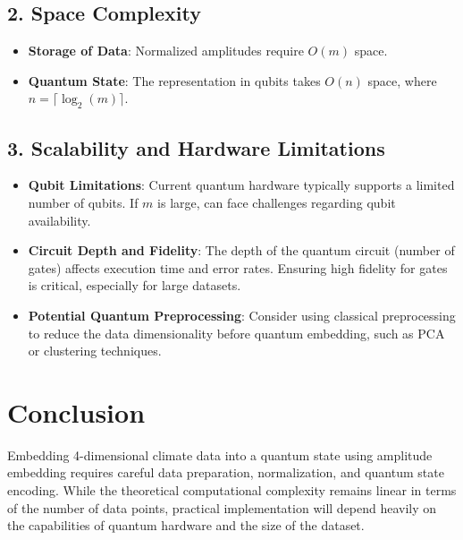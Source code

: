 \documentclass{article}
\begin{document}
\subsection{2. Space Complexity}
\begin{itemize}
    \item \textbf{Storage of Data}: Normalized amplitudes require \( O(m) \) space.
    \item \textbf{Quantum State}: The representation in qubits takes \( O(n) \) space, where \( n = \lceil \log_2(m) \rceil \).
\end{itemize}

\subsection{3. Scalability and Hardware Limitations}
\begin{itemize}
    \item \textbf{Qubit Limitations}: Current quantum hardware typically supports a limited number of qubits. If \( m \) is large, can face challenges regarding qubit availability.
    \item \textbf{Circuit Depth and Fidelity}: The depth of the quantum circuit (number of gates) affects execution time and error rates. Ensuring high fidelity for gates is critical, especially for large datasets.
    \item \textbf{Potential Quantum Preprocessing}: Consider using classical preprocessing to reduce the data dimensionality before quantum embedding, such as PCA or clustering techniques.
\end{itemize}

\section{Conclusion}
Embedding 4-dimensional climate data into a quantum state using amplitude embedding requires careful data preparation, normalization, and quantum state encoding. While the theoretical computational complexity remains linear in terms of the number of data points, practical implementation will depend heavily on the capabilities of quantum hardware and the size of the dataset.
\end{document}
